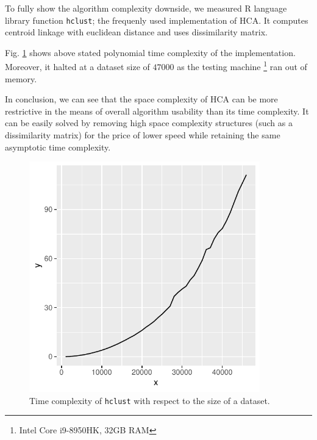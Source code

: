 \begin{example}

To fully show the algorithm complexity downside, we measured R language library function \texttt{hclust}; the frequenly used implementation of HCA. It computes centroid linkage with euclidean distance and uses dissimilarity matrix. 

Fig. \ref{fig01:hclust} shows above stated polynomial time complexity of the implementation. Moreover, it halted at a dataset size of $47 000$ as the testing machine \footnote{Intel Core i9-8950HK, 32GB RAM} ran out of memory.

In conclusion, we can see that the space complexity of HCA can be more restrictive in the means of overall algorithm usability than its time complexity. It can be easily solved by removing high space complexity structures (such as a dissimilarity matrix) for the price of lower speed while retaining the same asymptotic time complexity.

\begin{figure}\centering
	\includegraphics[width=10cm]{img/hclust}
	\caption{Time complexity of \texttt{hclust} with respect to the size of a dataset.}
	\label{fig01:hclust}
\end{figure}

\end{example}

